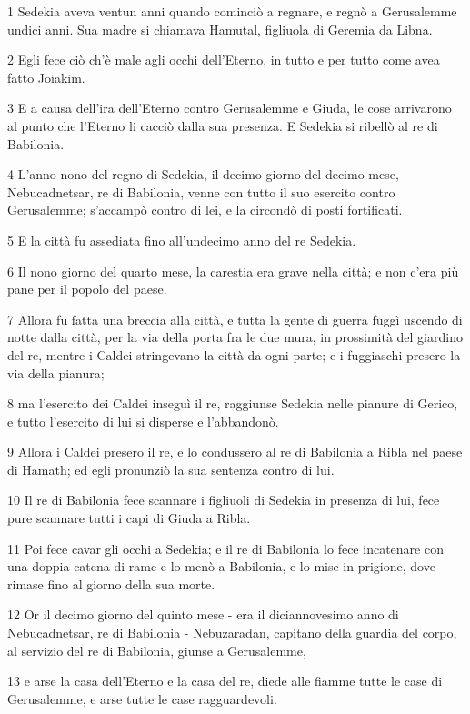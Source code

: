 \par 1 Sedekia aveva ventun anni quando cominciò a regnare, e regnò a Gerusalemme undici anni. Sua madre si chiamava Hamutal, figliuola di Geremia da Libna.
\par 2 Egli fece ciò ch'è male agli occhi dell'Eterno, in tutto e per tutto come avea fatto Joiakim.
\par 3 E a causa dell'ira dell'Eterno contro Gerusalemme e Giuda, le cose arrivarono al punto che l'Eterno li cacciò dalla sua presenza. E Sedekia si ribellò al re di Babilonia.
\par 4 L'anno nono del regno di Sedekia, il decimo giorno del decimo mese, Nebucadnetsar, re di Babilonia, venne con tutto il suo esercito contro Gerusalemme; s'accampò contro di lei, e la circondò di posti fortificati.
\par 5 E la città fu assediata fino all'undecimo anno del re Sedekia.
\par 6 Il nono giorno del quarto mese, la carestia era grave nella città; e non c'era più pane per il popolo del paese.
\par 7 Allora fu fatta una breccia alla città, e tutta la gente di guerra fuggì uscendo di notte dalla città, per la via della porta fra le due mura, in prossimità del giardino del re, mentre i Caldei stringevano la città da ogni parte; e i fuggiaschi presero la via della pianura;
\par 8 ma l'esercito dei Caldei inseguì il re, raggiunse Sedekia nelle pianure di Gerico, e tutto l'esercito di lui si disperse e l'abbandonò.
\par 9 Allora i Caldei presero il re, e lo condussero al re di Babilonia a Ribla nel paese di Hamath; ed egli pronunziò la sua sentenza contro di lui.
\par 10 Il re di Babilonia fece scannare i figliuoli di Sedekia in presenza di lui, fece pure scannare tutti i capi di Giuda a Ribla.
\par 11 Poi fece cavar gli occhi a Sedekia; e il re di Babilonia lo fece incatenare con una doppia catena di rame e lo menò a Babilonia, e lo mise in prigione, dove rimase fino al giorno della sua morte.
\par 12 Or il decimo giorno del quinto mese - era il diciannovesimo anno di Nebucadnetsar, re di Babilonia - Nebuzaradan, capitano della guardia del corpo, al servizio del re di Babilonia, giunse a Gerusalemme,
\par 13 e arse la casa dell'Eterno e la casa del re, diede alle fiamme tutte le case di Gerusalemme, e arse tutte le case ragguardevoli.
